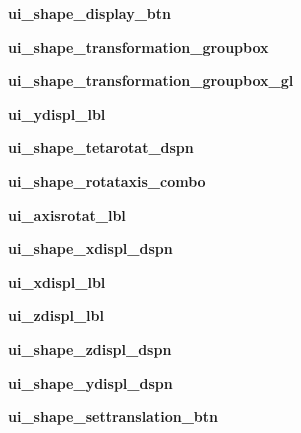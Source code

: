 \begin{DoxyCompactItemize}
\item 
\hypertarget{a00105_ae8028f5880df8b13414eba6f474a3aee}{}\label{a00105_ae8028f5880df8b13414eba6f474a3aee} 
{\bfseries ui\+\_\+shape\+\_\+display\+\_\+btn}
\item 
\hypertarget{a00105_a1fc23acd26cd3067a21b1814e61be00e}{}\label{a00105_a1fc23acd26cd3067a21b1814e61be00e} 
{\bfseries ui\+\_\+shape\+\_\+transformation\+\_\+groupbox}
\item 
\hypertarget{a00105_aebd41dcf93d9fad7a4dca658b1889a44}{}\label{a00105_aebd41dcf93d9fad7a4dca658b1889a44} 
{\bfseries ui\+\_\+shape\+\_\+transformation\+\_\+groupbox\+\_\+gl}
\item 
\hypertarget{a00105_a692312c2b09073353e2bfb7432092583}{}\label{a00105_a692312c2b09073353e2bfb7432092583} 
{\bfseries ui\+\_\+ydispl\+\_\+lbl}
\item 
\hypertarget{a00105_aa28c70006d121bac80ae12022d751fd9}{}\label{a00105_aa28c70006d121bac80ae12022d751fd9} 
{\bfseries ui\+\_\+shape\+\_\+tetarotat\+\_\+dspn}
\item 
\hypertarget{a00105_ab8782732fd9dcbabe62718d4fd1eb451}{}\label{a00105_ab8782732fd9dcbabe62718d4fd1eb451} 
{\bfseries ui\+\_\+shape\+\_\+rotataxis\+\_\+combo}
\item 
\hypertarget{a00105_a9f2714b1287e94beaec813c4859a76ed}{}\label{a00105_a9f2714b1287e94beaec813c4859a76ed} 
{\bfseries ui\+\_\+axisrotat\+\_\+lbl}
\item 
\hypertarget{a00105_a9a614d93a0e921aa5e8e2692269ea93e}{}\label{a00105_a9a614d93a0e921aa5e8e2692269ea93e} 
{\bfseries ui\+\_\+shape\+\_\+xdispl\+\_\+dspn}
\item 
\hypertarget{a00105_a365b7f614170273dffc60d90f68e7b50}{}\label{a00105_a365b7f614170273dffc60d90f68e7b50} 
{\bfseries ui\+\_\+xdispl\+\_\+lbl}
\item 
\hypertarget{a00105_a6393abac6ef3d14dd99f90c2038ce668}{}\label{a00105_a6393abac6ef3d14dd99f90c2038ce668} 
{\bfseries ui\+\_\+zdispl\+\_\+lbl}
\item 
\hypertarget{a00105_ac2513163c4489ee11aa128f248ac25bc}{}\label{a00105_ac2513163c4489ee11aa128f248ac25bc} 
{\bfseries ui\+\_\+shape\+\_\+zdispl\+\_\+dspn}
\item 
\hypertarget{a00105_a6d782a6f55b193b51dbc457441b6bb6b}{}\label{a00105_a6d782a6f55b193b51dbc457441b6bb6b} 
{\bfseries ui\+\_\+shape\+\_\+ydispl\+\_\+dspn}
\item 
\hypertarget{a00105_a7463f5748bcd87fed9c7aa83d70d7b4c}{}\label{a00105_a7463f5748bcd87fed9c7aa83d70d7b4c} 
{\bfseries ui\+\_\+shape\+\_\+settranslation\+\_\+btn}

\end{DoxyCompactItemize}
